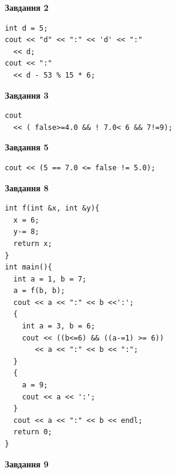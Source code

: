 \documentclass[12pt, ukrainian]{article}
\begin{document}
{\begin {large}
\begin{minipage}[t]{7.0cm}
\end{minipage}
\vline \hspace{1mm}
\begin{minipage}[t]{11.0cm}

\begin{center}
\textbf{Завдання 2}
\end{center}
\vspace{-8mm}

\begin{verbatim}
int d = 5;
cout << "d" << ":" << 'd' << ":" 
  << d;
cout << ":" 
  << d - 53 % 15 * 6;
\end{verbatim}



\begin{center}
\textbf{Завдання 3}
\end{center}
\vspace{-8mm}

\begin{verbatim}
cout 
  << ( false>=4.0 && ! 7.0< 6 && 7!=9);
\end{verbatim}



\begin{center}
\textbf{Завдання 5}
\end{center}
\vspace{-8mm}

\begin{verbatim}
cout << (5 == 7.0 <= false != 5.0);
\end{verbatim}



\begin{center}
\textbf{Завдання 8}
\end{center}
\vspace{-8mm}

\begin{verbatim}
int f(int &x, int &y){
  x = 6;
  y-= 8;
  return x;
}
int main(){
  int a = 1, b = 7;
  a = f(b, b);
  cout << a << ":" << b <<':';
  {
    int a = 3, b = 6;
    cout << ((b<=6) && ((a-=1) >= 6))
       << a << ":" << b << ":";
  }
  {
    a = 9;
    cout << a << ':';
  }
  cout << a << ":" << b << endl;
  return 0;
}
\end{verbatim}

\end{minipage}


\begin{minipage}[t]{7.0cm}

\begin{center}
\textbf{Завдання 9}
\end{center}
\vspace{-8mm}


\end{minipage}
\end{large}}
\end{document}
